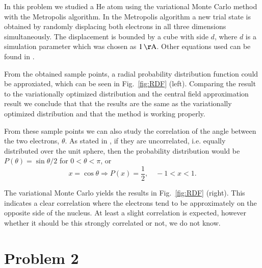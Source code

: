 In this problem we studied a He atom using the variational Monte Carlo method with the Metropolis algorithm. In the Metropolis algorithm a new trial state is obtained by randomly displacing both electrons in all three dimensions simultaneously. The displacement is bounded by a cube with side $d$, where $d$ is a simulation parameter which was chosen as $\unit[1]{\AA}$. Other equations used can be found in \cite{probdesc}.

From the obtained sample points, a radial probability distribution function could be approxiated, which can be seen in Fig.~\ref{fig:RDF} (left). Comparing the result to the variationally optimized distribution and the central field approximation result we conclude that that the results are the same as the variationally optimized distribution and that the method is working properly.

From these sample points we can also study the correlation of the angle between the two electrons, $\theta$. As stated in \cite{probdesc}, if they are uncorrelated, i.e. equally distributed over the unit sphere, then the probability distribution would be $P(\theta) = \sin \theta / 2$ for $0 < \theta < \pi$, or
\begin{equation}
	x = \cos \theta \Rightarrow P(x) = \frac{1}{2},\quad -1 < x < 1.
\end{equation}

The variational Monte Carlo yields the results in Fig.~\ref{fig:RDF} (right). This indicates a clear correlation where the electrons tend to be approximately on the opposite side of the nucleus. At least a slight correlation is expected, however whether it should be this strongly correlated or not, we do not know.


\section*{Problem 2}

